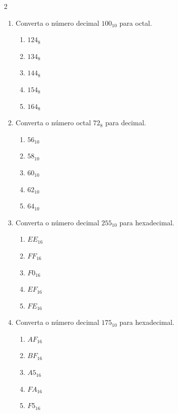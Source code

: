 \documentclass[a4paper,12pt]{article}
\begin{document}
\begin{multicols}{2}
\begin{enumerate}[leftmargin=*]
\vspace{0.2cm}

\item Converta o número decimal $100_{10}$ para octal.

\begin{enumerate}[label=(\Alph*)]
    \item $124_8$
    \item $134_8$
    \item $144_8$
    \item $154_8$
    \item $164_8$
\end{enumerate}

\vspace{0.2cm}

\item Converta o número octal $72_8$ para decimal.

\begin{enumerate}[label=(\Alph*)]
    \item $56_{10}$
    \item $58_{10}$
    \item $60_{10}$
    \item $62_{10}$
    \item $64_{10}$
\end{enumerate}

\vspace{0.2cm}


\item Converta o número decimal $255_{10}$ para hexadecimal.

\begin{enumerate}[label=(\Alph*)]
    \item $EE_{16}$
    \item $FF_{16}$
    \item $F0_{16}$
    \item $EF_{16}$
    \item $FE_{16}$
\end{enumerate}

\vspace{0.2cm}

\item Converta o número decimal $175_{10}$ para hexadecimal.

\begin{enumerate}[label=(\Alph*)]
    \item $AF_{16}$
    \item $BF_{16}$
    \item $A5_{16}$
    \item $FA_{16}$
    \item $F5_{16}$
\end{enumerate}


\end{enumerate}
\end{multicols}
\end{document}
